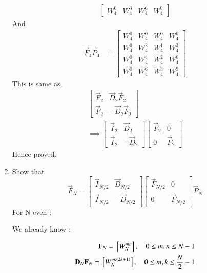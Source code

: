 \documentclass[journal,12pt,twocolumn]{IEEEtran}
\renewcommand\thesection{\arabic{section}}
\begin{document}
\begin{enumerate}[label=\arabic*.,ref=\thesection.\theenumi]
\begin{align}
\begin{bmatrix}
			W_4^0 & W_4^3 & W_4^6 & W_4^9   
		\end{bmatrix}
	\end{align}
	And 
	\begin{align}
		\vec{F}_{4}\vec{P}_{4} &= \begin{bmatrix}
			W_4^0 &  W_4^0& W_4^0 & W_4^0 \\
			W_4^0 & W_4^2 & W_4^1 & W_4^3  \\
			W_4^0 & W_4^4 & W_4^2 &  W_4^6 \\
			W_4^0 & W_4^6 & W_4^3 & W_4^9       
		\end{bmatrix}
	\end{align} 
	This is same as,
	\begin{align}
		\begin{bmatrix}
			\vec{F}_{2} & \vec{D}_{2}\vec{F}_{2} \\
			\vec{F}_{2} & -\vec{D}_{2}\vec{F}_{2}
		\end{bmatrix}\\
		\implies \begin{bmatrix}
			\vec{I}_{2} & \vec{D}_{2} \\
			\vec{I}_{2} & -\vec{D}_{2}
		\end{bmatrix}
		\begin{bmatrix}
			\vec{F}_{2} & 0 \\
			0 & \vec{F}_{2}   
		\end{bmatrix}   
	\end{align} 
	Hence proved.
	
	\item Show that 
	\begin{equation}
		\vec{F}_{N}=
		\begin{bmatrix}
			\vec{I}_{N/2} & \vec{D}_{N/2} \\
			\vec{I}_{N/2} & -\vec{D}_{N/2}
		\end{bmatrix}
		\begin{bmatrix}
			\vec{F}_{N/2} & 0 \\
			0 & \vec{F}_{N/2}
		\end{bmatrix}
		\vec{P}_{N}
	\end{equation}
\solution
For N even ;

We already know ;

\begin{align}
	\mathbf{F}_{N} = {}\left[W_{N}^{mn}\right], \quad 0 \le m,n \le N-1  	\\
	\mathbf{D}_{N}\mathbf{F}_{N} = {}\left[W_{N}^{m.(2k+1)}\right], \quad 0 \le m,k \le \frac{N}{2}-1  	
\end{align}


\end{enumerate}
\end{document}
